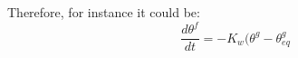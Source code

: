 Therefore, for instance it could be:
\begin{equation}
\frac{d \theta^f}{dt} = - K_w ({\theta^g - \theta^g_{eq}}
\end{equation}